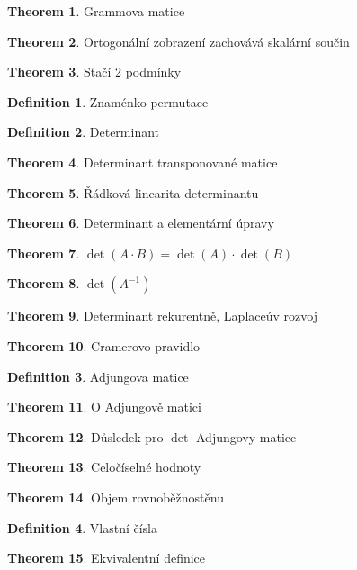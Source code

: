 \documentclass[a4paper]{article}
\theoremstyle{definition}
\newtheorem{definition}{Definition}
\newtheorem{theorem}{Theorem}
\begin{document}
\begin{theorem}{Grammova matice} \end{theorem}
\begin{theorem}{Ortogonální zobrazení zachovává skalární součin} \end{theorem}
\begin{theorem}{Stačí 2 podmínky} \end{theorem}
\begin{definition}{Znaménko permutace} \end{definition}
\begin{definition}{Determinant} \end{definition}
\begin{theorem}{Determinant transponované matice} \end{theorem}
\begin{theorem}{Řádková linearita determinantu} \end{theorem}
\begin{theorem}{Determinant a elementární úpravy} \end{theorem}
\begin{theorem}{$\det(A\cdot B) = \det(A) \cdot \det(B)$} \end{theorem}
\begin{theorem}{$\det(A^{-1})$} \end{theorem}
\begin{theorem}{Determinant rekurentně, Laplaceúv rozvoj} \end{theorem}
\begin{theorem}{Cramerovo pravidlo} \end{theorem}
\begin{definition}{Adjungova matice} \end{definition}
\begin{theorem}{O Adjungově matici} \end{theorem}
\begin{theorem}{Důsledek pro $\det$ Adjungovy matice} \end{theorem}
\begin{theorem}{Celočíselné hodnoty} \end{theorem}
\begin{theorem}{Objem rovnoběžnostěnu} \end{theorem}
\begin{definition}{Vlastní čísla} \end{definition}
\begin{theorem}{Ekvivalentní definice} \end{theorem}
\end{document}
